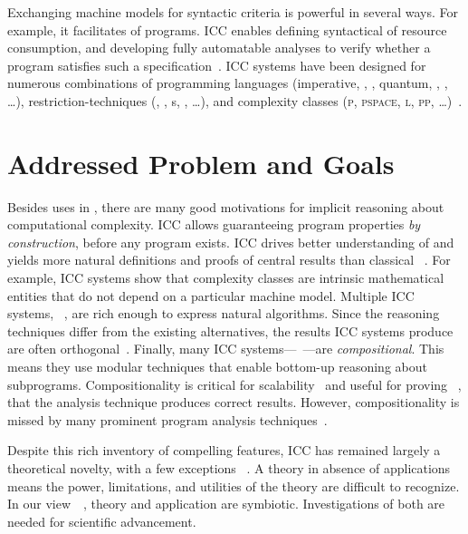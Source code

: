 Exchanging machine models for syntactic criteria is powerful in several ways.
For example, it facilitates  of programs. ICC enables
defining {syntactical}  of resource consumption, and
developing fully automatable analyses to verify whether a program satisfies such
a specification~\cite{heraud2011}. ICC systems have been designed for numerous
combinations of programming languages (imperative,
, , quantum, , , \ldots),
restriction-techniques (, , s, , \ldots), and complexity classes (\textsc{p},
\textsc{pspace}, \textsc{l}, \textsc{pp}, \ldots)~\cite{moyen2017,pchoux2020}.

\section{Addressed Problem and Goals}
\label{sec:aicc-goals}

Besides uses in , there are many
good motivations for implicit reasoning about computational complexity. ICC
allows guaranteeing program properties \emph{by construction}, before any
program exists. ICC drives better understanding of  and yields more natural definitions and proofs
of central results than classical ~\cite{kristiansen2017}. For example, ICC systems
show that complexity classes are intrinsic mathematical entities that do not
depend on a particular machine model. Multiple ICC systems,
\eg~\cite{jones2009,marion2011}, are rich enough to express natural algorithms.
Since the reasoning techniques differ from the existing alternatives, the
results ICC systems produce are often orthogonal~\cite{aubert20222}. Finally,
many ICC systems---\eg~\cite{jones2009,marion2011,hainry2023,atkey2024}---are
\emph{compositional}. This means they use modular
techniques that enable bottom-up reasoning about subprograms. Compositionality
is critical for scalability~\cite{carbonneaux2015} and useful for proving
~\cite{keidel2021}, \ie that the analysis technique
produces correct results. However, compositionality is missed by many prominent
program analysis techniques~\cite{carbonneaux2015,schiebel2024}.

Despite this rich inventory of compelling features, ICC has remained largely a
theoretical novelty, with a few exceptions%
~\cite{avanzini2017,avanzini2008,moyen20172,hainry2021,hoffmann2012,feree2018}.
A theory in absence of applications means the power, limitations, and utilities
of the theory are difficult to recognize. In our view~\cite[p.
xxxv]{bishop2003}~\cite[p. 75]{moyen2017}, theory and application are
{symbiotic}. Investigations of both are needed for scientific advancement.

